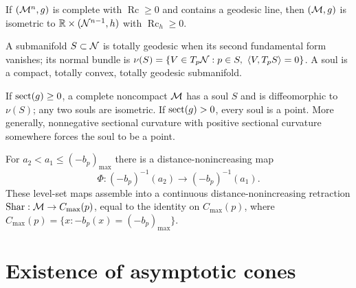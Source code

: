 \begin{theorem}
\label{thm:chow-iii-i18-splitting}
If $(\M^n,g)$ is complete with $\operatorname{Rc}\ge0$ and contains a geodesic
line, then $(\M,g)$ is isometric to $\R\times(\N^{n-1},h)$ with
$\operatorname{Rc}_h\ge0$.
\end{theorem}

\begin{definition}[Soul]
\label{def:chow-iii-i20-i21-soul}
A submanifold $S\subset\N$ is totally geodesic when its second fundamental
form vanishes; its normal bundle is
$\nu(S)=\{V\in T_p\N:p\in S,\ \langle V,T_pS\rangle=0\}$.  A soul is a
compact, totally convex, totally geodesic submanifold.
\end{definition}

\begin{theorem}
\label{thm:chow-iii-i22-i23-soul}
If $\operatorname{sect}(g)\ge0$, a complete noncompact $\M$ has a soul $S$ and is
diffeomorphic to $\nu(S)$; any two souls are isometric.  If $\operatorname{sect}(g)>0$,
every soul is a point.  More generally, nonnegative sectional curvature with
positive sectional curvature somewhere forces the soul to be a point.
\end{theorem}

\begin{theorem}
\label{thm:chow-iii-i24-i25-sharafutdinov}
For $a_2<a_1\le(-b_p)_{\max}$ there is a distance-nonincreasing map
\[
\Phi:(-b_p)^{-1}(a_2)\longrightarrow(-b_p)^{-1}(a_1).
\]
These level-set maps assemble into a continuous distance-nonincreasing
retraction $\Shar:\M\to C_{\max}(p)$, equal to the identity on $C_{\max}(p)$,
where $C_{\max}(p)=\{x:-b_p(x)=(-b_p)_{\max}\}$.
\end{theorem}

\section{Existence of asymptotic cones}


